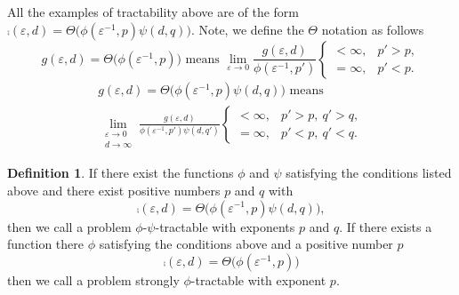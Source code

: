 \documentclass{article}
\theoremstyle{definition}
\newtheorem{definition}{Definition}
\begin{document}
All the examples of tractability above are of the form $\comp(\varepsilon, d) = \Theta \bigl( \phi(\varepsilon^{-1},p) \psi(d,q)\bigr)$.  Note, we define the $\Theta$ notation as follows
\begin{equation*}
     g(\varepsilon,d) = \Theta\bigl(\phi(\varepsilon^{-1},p) \bigr) \text{ means } 
    \lim_{\varepsilon \to 0} \frac{g(\varepsilon,d)}{\phi(\varepsilon^{-1},p')}
           \begin{cases} < \infty, & p'> p,  \\ 
          =\infty, & p' < p.\end{cases}
\end{equation*}
\begin{multline*}
     g(\varepsilon,d) = \Theta\bigl(\phi(\varepsilon^{-1},p) \psi(d,q) \bigr) \text{ means } \\
    \lim_{\substack{\varepsilon \to 0 \\ d \to \infty}} \frac{g(\varepsilon,d)}{\phi(\varepsilon^{-1},p') \psi(d,q')}
          \begin{cases} < \infty, & p'> p, \  q' > q,  \\ 
          =\infty, & p' < p, \ q' < q.\end{cases}
\end{multline*}


\begin{definition}
If there exist the functions $\phi$ and $\psi$ satisfying the conditions listed above and there exist positive numbers $p$ and $q$ with
\[
\comp(\varepsilon, d)  = \Theta\bigl(\phi(\varepsilon^{-1},p) \psi(d,q) \bigr),
\]
then we call a problem $\phi$-$\psi$-tractable with exponents $p$ and $q$.  If there exists a function there $\phi$ satisfying the conditions above and a positive number $p$
\[
\comp(\varepsilon, d)  = \Theta\bigl(\phi(\varepsilon^{-1},p) \bigr)
\]
then we call a problem strongly $\phi$-tractable with exponent $p$.
\end{definition}
\end{document}
